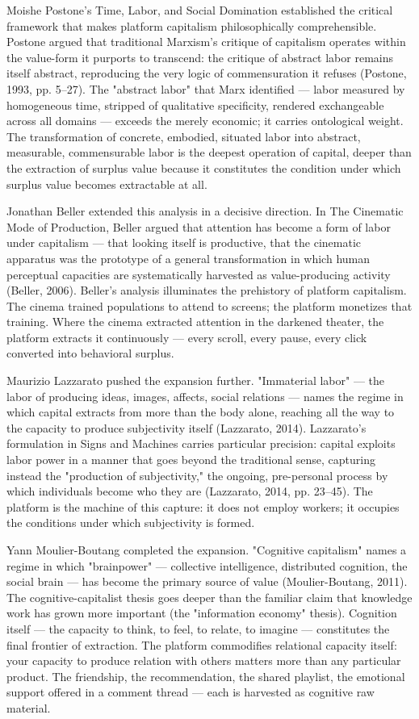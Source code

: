 Moishe Postone's Time, Labor, and Social Domination established the critical framework that makes platform capitalism philosophically comprehensible. Postone argued that traditional Marxism's critique of capitalism operates within the value-form it purports to transcend: the critique of abstract labor remains itself abstract, reproducing the very logic of commensuration it refuses (Postone, 1993, pp. 5–27). The "abstract labor" that Marx identified — labor measured by homogeneous time, stripped of qualitative specificity, rendered exchangeable across all domains — exceeds the merely economic; it carries ontological weight. The transformation of concrete, embodied, situated labor into abstract, measurable, commensurable labor is the deepest operation of capital, deeper than the extraction of surplus value because it constitutes the condition under which surplus value becomes extractable at all.

Jonathan Beller extended this analysis in a decisive direction. In The Cinematic Mode of Production, Beller argued that attention has become a form of labor under capitalism — that looking itself is productive, that the cinematic apparatus was the prototype of a general transformation in which human perceptual capacities are systematically harvested as value-producing activity (Beller, 2006). Beller's analysis illuminates the prehistory of platform capitalism. The cinema trained populations to attend to screens; the platform monetizes that training. Where the cinema extracted attention in the darkened theater, the platform extracts it continuously — every scroll, every pause, every click converted into behavioral surplus.

Maurizio Lazzarato pushed the expansion further. "Immaterial labor" — the labor of producing ideas, images, affects, social relations — names the regime in which capital extracts from more than the body alone, reaching all the way to the capacity to produce subjectivity itself (Lazzarato, 2014). Lazzarato's formulation in Signs and Machines carries particular precision: capital exploits labor power in a manner that goes beyond the traditional sense, capturing instead the "production of subjectivity," the ongoing, pre-personal process by which individuals become who they are (Lazzarato, 2014, pp. 23–45). The platform is the machine of this capture: it does not employ workers; it occupies the conditions under which subjectivity is formed.

Yann Moulier-Boutang completed the expansion. "Cognitive capitalism" names a regime in which "brainpower" — collective intelligence, distributed cognition, the social brain — has become the primary source of value (Moulier-Boutang, 2011). The cognitive-capitalist thesis goes deeper than the familiar claim that knowledge work has grown more important (the "information economy" thesis). Cognition itself — the capacity to think, to feel, to relate, to imagine — constitutes the final frontier of extraction. The platform commodifies relational capacity itself: your capacity to produce relation with others matters more than any particular product. The friendship, the recommendation, the shared playlist, the emotional support offered in a comment thread — each is harvested as cognitive raw material.

